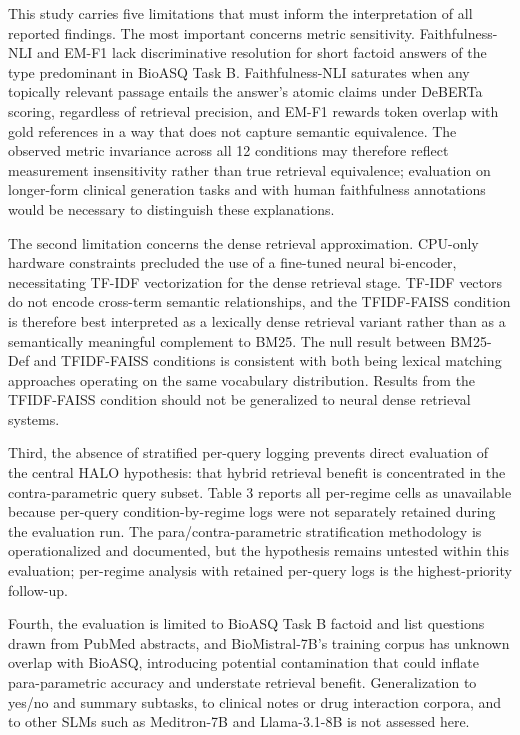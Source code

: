 \documentclass{article}
\begin{document}
\label{sec:limitations}

This study carries five limitations that must inform the interpretation of all reported findings. The most important concerns metric sensitivity. Faithfulness-NLI and EM-F1 lack discriminative resolution for short factoid answers of the type predominant in BioASQ Task B. Faithfulness-NLI saturates when any topically relevant passage entails the answer's atomic claims under DeBERTa scoring, regardless of retrieval precision, and EM-F1 rewards token overlap with gold references in a way that does not capture semantic equivalence. The observed metric invariance across all 12 conditions may therefore reflect measurement insensitivity rather than true retrieval equivalence; evaluation on longer-form clinical generation tasks and with human faithfulness annotations would be necessary to distinguish these explanations.

The second limitation concerns the dense retrieval approximation. CPU-only hardware constraints precluded the use of a fine-tuned neural bi-encoder, necessitating TF-IDF vectorization for the dense retrieval stage. TF-IDF vectors do not encode cross-term semantic relationships, and the TFIDF-FAISS condition is therefore best interpreted as a lexically dense retrieval variant rather than as a semantically meaningful complement to BM25. The null result between BM25-Def and TFIDF-FAISS conditions is consistent with both being lexical matching approaches operating on the same vocabulary distribution. Results from the TFIDF-FAISS condition should not be generalized to neural dense retrieval systems.

Third, the absence of stratified per-query logging prevents direct evaluation of the central HALO hypothesis: that hybrid retrieval benefit is concentrated in the contra-parametric query subset. Table 3 reports all per-regime cells as unavailable because per-query condition-by-regime logs were not separately retained during the evaluation run. The para/contra-parametric stratification methodology is operationalized and documented, but the hypothesis remains untested within this evaluation; per-regime analysis with retained per-query logs is the highest-priority follow-up.

Fourth, the evaluation is limited to BioASQ Task B factoid and list questions drawn from PubMed abstracts, and BioMistral-7B's training corpus has unknown overlap with BioASQ, introducing potential contamination that could inflate para-parametric accuracy and understate retrieval benefit. Generalization to yes/no and summary subtasks, to clinical notes or drug interaction corpora, and to other SLMs such as Meditron-7B and Llama-3.1-8B is not assessed here.
\end{document}
